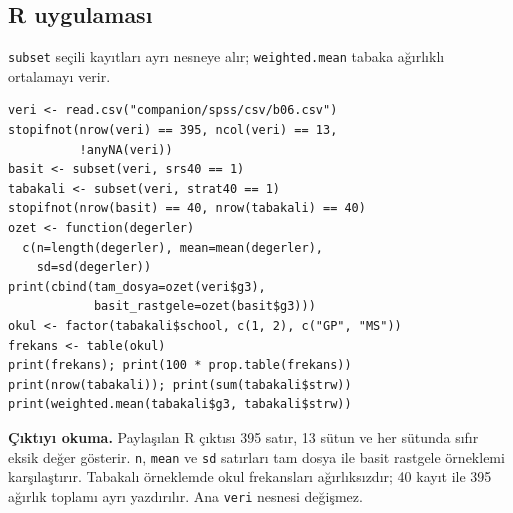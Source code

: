 \par\noindent\begin{minipage}{\linewidth}
\subsection{R uygulaması}
\label{sec:r-gercek-b06}

\texttt{subset} seçili kayıtları ayrı nesneye alır; \texttt{weighted.mean} tabaka ağırlıklı ortalamayı verir.

\begin{lstlisting}[style=prismR]
veri <- read.csv("companion/spss/csv/b06.csv")
stopifnot(nrow(veri) == 395, ncol(veri) == 13,
          !anyNA(veri))
basit <- subset(veri, srs40 == 1)
tabakali <- subset(veri, strat40 == 1)
stopifnot(nrow(basit) == 40, nrow(tabakali) == 40)
ozet <- function(degerler)
  c(n=length(degerler), mean=mean(degerler),
    sd=sd(degerler))
print(cbind(tam_dosya=ozet(veri$g3),
            basit_rastgele=ozet(basit$g3)))
okul <- factor(tabakali$school, c(1, 2), c("GP", "MS"))
frekans <- table(okul)
print(frekans); print(100 * prop.table(frekans))
print(nrow(tabakali)); print(sum(tabakali$strw))
print(weighted.mean(tabakali$g3, tabakali$strw))
\end{lstlisting}

\textbf{Çıktıyı okuma.} Paylaşılan R çıktısı 395 satır, 13 sütun ve
her sütunda sıfır eksik değer gösterir. \texttt{n}, \texttt{mean} ve
\texttt{sd} satırları tam dosya ile basit rastgele örneklemi karşılaştırır.
Tabakalı örneklemde okul frekansları ağırlıksızdır; 40 kayıt ile 395
ağırlık toplamı ayrı yazdırılır. Ana \texttt{veri} nesnesi değişmez.
\end{minipage}\par

